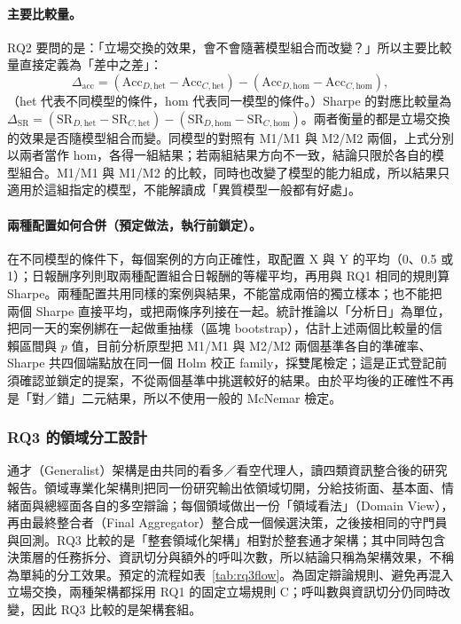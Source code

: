 \paragraph{主要比較量。} RQ2 要問的是：「立場交換的效果，會不會隨著模型組合而改變？」所以主要比較量直接定義為「差中之差」：
\[
\Delta_{\mathrm{acc}}=(\mathrm{Acc}_{D,\mathrm{het}}-\mathrm{Acc}_{C,\mathrm{het}})-(\mathrm{Acc}_{D,\mathrm{hom}}-\mathrm{Acc}_{C,\mathrm{hom}}),
\]
（het 代表不同模型的條件，hom 代表同一模型的條件。）Sharpe 的對應比較量為 $\Delta_{\mathrm{SR}}=(\mathrm{SR}_{D,\mathrm{het}}-\mathrm{SR}_{C,\mathrm{het}})-(\mathrm{SR}_{D,\mathrm{hom}}-\mathrm{SR}_{C,\mathrm{hom}})$。兩者衡量的都是立場交換的效果是否隨模型組合而變。同模型的對照有 M1/M1 與 M2/M2 兩個，上式分別以兩者當作 hom，各得一組結果；若兩組結果方向不一致，結論只限於各自的模型組合。M1/M1 與 M1/M2 的比較，同時也改變了模型的能力組成，所以結果只適用於這組指定的模型，不能解讀成「異質模型一般都有好處」。

\paragraph{兩種配置如何合併（預定做法，執行前鎖定）。} 在不同模型的條件下，每個案例的方向正確性，取配置 X 與 Y 的平均（0、0.5 或 1）；日報酬序列則取兩種配置組合日報酬的等權平均，再用與 RQ1 相同的規則算 Sharpe。兩種配置共用同樣的案例與結果，不能當成兩倍的獨立樣本；也不能把兩個 Sharpe 直接平均，或把兩條序列接在一起。統計推論以「分析日」為單位，把同一天的案例綁在一起做重抽樣（區塊 bootstrap），估計上述兩個比較量的信賴區間與 $p$ 值，目前分析原型把 M1/M1 與 M2/M2 兩個基準各自的準確率、Sharpe 共四個端點放在同一個 Holm 校正 family，採雙尾檢定；這是正式登記前須確認並鎖定的提案，不從兩個基準中挑選較好的結果。由於平均後的正確性不再是「對／錯」二元結果，所以不使用一般的 McNemar 檢定。

\subsubsection{RQ3 的領域分工設計}
通才（Generalist）架構是由共同的看多／看空代理人，讀四類資訊整合後的研究報告。領域專業化架構則把同一份研究輸出依領域切開，分給技術面、基本面、情緒面與總經面各自的多空辯論；每個領域做出一份「領域看法」（Domain View），再由最終整合者（Final Aggregator）整合成一個候選決策，之後接相同的守門員與回測。RQ3 比較的是「整套領域化架構」相對於整套通才架構；其中同時包含決策層的任務拆分、資訊切分與額外的呼叫次數，所以結論只稱為架構效果，不稱為單純的分工效果。預定的流程如表~\ref{tab:rq3flow}。為固定辯論規則、避免再混入立場交換，兩種架構都採用 RQ1 的固定立場規則 C；呼叫數與資訊切分仍同時改變，因此 RQ3 比較的是架構套組。

